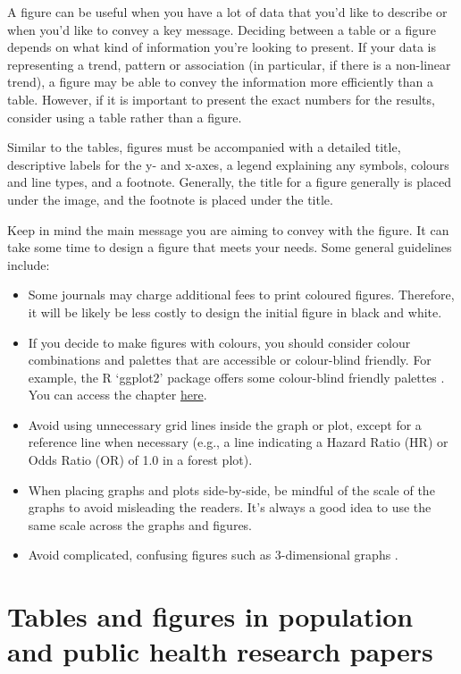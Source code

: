 \documentclass[
]{book}
\begin{document}
A figure can be useful when you have a lot of data that you'd like to describe or when you'd like to convey a key message. Deciding between a table or a figure depends on what kind of information you're looking to present. If your data is representing a trend, pattern or association (in particular, if there is a non-linear trend), a figure may be able to convey the information more efficiently than a table. However, if it is important to present the exact numbers for the results, consider using a table rather than a figure.

Similar to the tables, figures must be accompanied with a detailed title, descriptive labels for the y- and x-axes, a legend explaining any symbols, colours and line types, and a footnote. Generally, the title for a figure generally is placed under the image, and the footnote is placed under the title.

Keep in mind the main message you are aiming to convey with the figure. It can take some time to design a figure that meets your needs. Some general guidelines include:

\begin{itemize}
\item
  Some journals may charge additional fees to print coloured figures. Therefore, it will be likely be less costly to design the initial figure in black and white.
\item
  If you decide to make figures with colours, you should consider colour combinations and palettes that are accessible or colour-blind friendly. For example, the R `ggplot2' package offers some colour-blind friendly palettes \citep{chang}. You can access the chapter \href{http://www.cookbook-r.com/Graphs/Colors_(ggplot2)/\#a-colorblind-friendly-palette}{here}.
\item
  Avoid using unnecessary grid lines inside the graph or plot, except for a reference line when necessary (e.g., a line indicating a Hazard Ratio (HR) or Odds Ratio (OR) of 1.0 in a forest plot).
\item
  When placing graphs and plots side-by-side, be mindful of the scale of the graphs to avoid misleading the readers. It's always a good idea to use the same scale across the graphs and figures.
\item
  Avoid complicated, confusing figures such as 3-dimensional graphs \citep{franzblau2012graphs}.
\end{itemize}

\hypertarget{tables-and-figures-in-population-and-public-health-research-papers}{%
\section{Tables and figures in population and public health research papers}\label{tables-and-figures-in-population-and-public-health-research-papers}}
\end{document}
